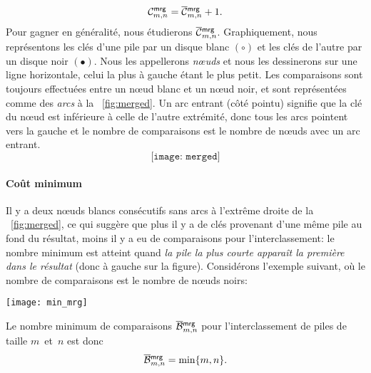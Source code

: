 \begin{equation}
\C{\fun{mrg}}{m,n} = \OC{\fun{mrg}}{m,n} + 1.\label{def:cost_mrg}
\end{equation}
Pour gagner en généralité, nous étudierons
\(\OC{\fun{mrg}}{m,n}\). Graphiquement, nous représentons les clés
d'une pile par un disque blanc \((\circ)\) et les clés de l'autre par
un disque noir \((\bullet)\). Nous les appellerons \emph{n{\oe}uds} et
nous les dessinerons sur une ligne horizontale, celui la plus à gauche
étant le plus petit. Les comparaisons sont toujours effectuées entre
un n{\oe}ud blanc et un n{\oe}ud noir, et sont représentées comme des
\emph{arcs} à la \fig~\vref{fig:merged}.  Un arc entrant (côté pointu)
signifie que la clé du n{\oe}ud est inférieure à celle de l'autre
extrémité, donc tous les arcs pointent vers la gauche et le nombre de
comparaisons est le nombre de n{\oe}uds avec un arc entrant.
\begin{equation}
\texttt{[image: merged]}%
\label{fig:merged}
\end{equation}

\paragraph{Coût minimum}
\label{merge_best_case}

Il y a deux n{\oe}uds blancs consécutifs sans arcs à l'extrême droite
de la \fig~\vref{fig:merged}, ce qui suggère que plus il y a de clés
provenant d'une même pile au fond du résultat, moins il y a eu de
comparaisons pour l'interclassement: le nombre minimum est atteint
quand \emph{la pile la plus courte apparaît la première dans le
  résultat} (donc à gauche sur la figure). Considérons l'exemple
suivant, où le nombre de comparaisons est le nombre de n{\oe}uds
noirs:
\begin{center}
\texttt{[image: min\_mrg]}
\end{center}
Le nombre minimum de comparaisons
\(\OB{\fun{mrg}}{m,n}\) pour
l'interclassement de piles de taille \(m\)~et~\(n\) est donc
\begin{equation}
\OB{\fun{mrg}}{m,n} = \min\{m,n\}.\label{eq:best_merge}
\end{equation}

